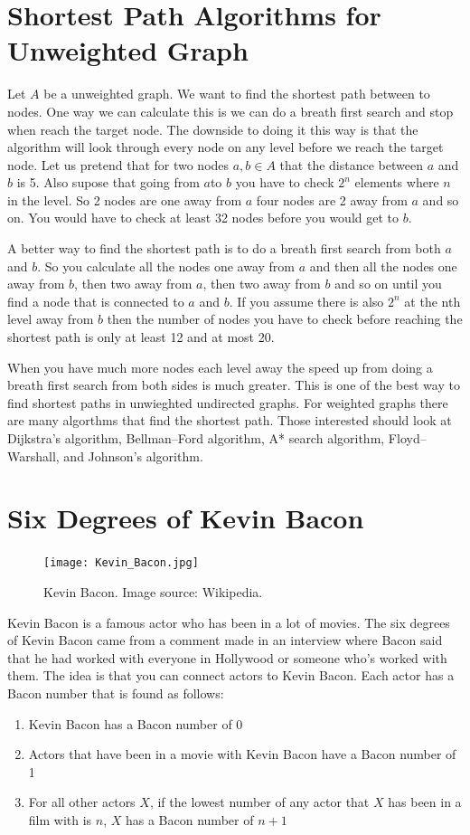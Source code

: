 \section*{Shortest Path Algorithms for Unweighted Graph}
Let $A$ be a unweighted graph. We want to find the shortest path between to nodes. One way we can calculate this is we can do a breath first search and stop when reach the target node. The downside to doing it this way is that the algorithm will look through every node on any level before we reach the target node. Let us pretend that for two nodes $a, b \in A$ that the distance between $a$ and $b$ is 5. Also supose that going from $a$to $b$ you have to check $2^n$ elements where $n$ in the level. So 2 nodes are one away from $a$ four nodes are 2 away from $a$ and so on. You would have to check at least 32 nodes before you would get to $b$.

A better way to find the shortest path is to do a breath first search from both $a$ and $b$. So you calculate all the nodes one away from $a$ and then all the nodes one away from $b$, then two away from $a$, then two away from $b$ and so on until you find a node that is connected to $a$ and $b$. If you assume there is also $2^n$ at the nth level away from $b$ then the number of nodes you have to check before reaching the shortest path is only at least 12 and at most 20.

When you have much more nodes each level away the speed up from doing a breath first search from both sides is much greater. This is one of the best way to find shortest paths in unwieghted undirected graphs. For weighted graphs there are many algorthms that find the shortest path. Those interested should look at Dijkstra's algorithm, Bellman–Ford algorithm, A* search algorithm, Floyd–Warshall, and Johnson's algorithm.


\section*{Six Degrees of Kevin Bacon}
\begin{figure}[h]
\texttt{[image: Kevin\_Bacon.jpg]}
\caption{Kevin Bacon.  Image source: Wikipedia.}
\end{figure}

Kevin Bacon is a famous actor who has been in a lot of movies. The six degrees of Kevin Bacon came from a comment made in an interview where Bacon said that he had worked with everyone in Hollywood or someone who's worked with them.  The idea is that you can connect actors to Kevin Bacon. Each actor has a Bacon number that is found as follows:
\begin{enumerate}
\item Kevin Bacon has a Bacon number of 0
\item Actors that have been in a movie with Kevin Bacon have a Bacon number of 1
\item For all other actors $X$, if the lowest number of any actor that $X$ has been in a film with is $n$, $X$ has a Bacon number of $n+1$
\end{enumerate}

